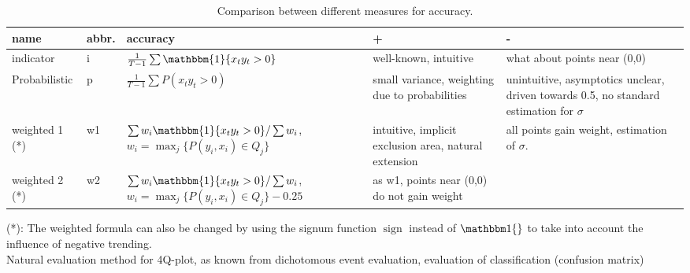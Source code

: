 \documentclass[oneside]{article}
\theoremstyle{plain}%
\theoremstyle{definition}
\DeclareMathOperator{\sign}{sign}
\newcommand{\ind}[1]{\mathbbm{1}\{#1\}}
\newcommand{\ydiff}{D y}
\newcommand{\xdiff}{Dx}
\begin{document}

\begin{table}[]
    \centering
    \begin{tabular}{l l p{4cm} p{4cm} p{4cm}}
    \toprule
    name & abbr. & accuracy & + & - \\ \midrule
    indicator & i & $\frac{1}{T-1} \sum \ind{x_t y_t > 0}$ &  well-known, intuitive & what about points near (0,0) \\
    Probabilistic & p & $\frac{1}{T-1} \sum P{(x_t y_t > 0)}$ & small variance, weighting due to probabilities & unintuitive, asymptotics unclear, driven towards 0.5, no standard estimation for $\sigma$  \\
    weighted 1 (*) & w1 & {\small{$\sum w_i \ind{x_t y_t > 0} / \sum w_i$,\newline $w_i = \max_j\{P(y_i, x_i) \in Q_j \}$}} & intuitive, implicit exclusion area, natural extension & all points gain weight, estimation of $\sigma$. \\
    weighted 2 (*) & w2 & {\small {$\sum w_i \ind{x_t y_t > 0} / \sum w_i$,\newline $w_i = \max_j\{P(y_i, x_i) \in Q_j \} - 0.25$}} & as w1, points near (0,0) do not gain weight & \\ \bottomrule
    \end{tabular}
    \caption{Comparison between different measures for accuracy. }
    \label{tab:comparison-measures}
\end{table}

(*): The weighted formula can also be changed by using the signum function $\sign$ instead of $\ind$ to take into account the influence of negative trending.\\

Natural evaluation method for 4Q-plot, as known from dichotomous event evaluation, evaluation of classification (confusion matrix)
\end{document}
